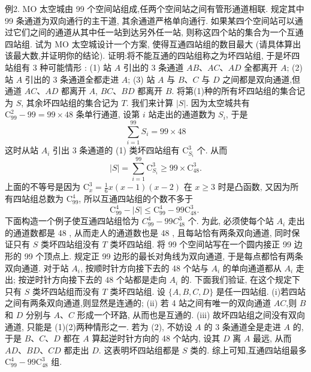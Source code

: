 例2. $\mathrm{MO}$ 太空城由 99 个空间站组成,任两个空间站之间有管形通道相联.
规定其中 99 条通道为双向通行的主干道, 其余通道严格单向通行.
如果某四个空间站可以通过它们之间的通道从其中任一站到达另外任一站, 则称这四个站的集合为一个互通四站组.
试为 $\mathrm{MO}$ 太空城设计一个方案, 使得互通四站组的数目最大 (请具体算出该最大数,并证明你的结论). 
证明:将不能互通的四站组称之为坏四站组, 于是坏四站组有 3 种可能情形 :
(1) 站 $A$ 引出的 3 条通道 $A B 、 A C 、 A D$ 全都离开 $A$;
(2) 站 $A$ 引出的 3 条通道全都走进 $A$;
(3) 站 $A$ 与 $B 、 C$ 与 $D$ 之间都是双向通道,但通道 $A C 、 A D$ 都离开 $A$, $B C 、 B D$ 都离开 $B$.
将第(1)种的所有坏四站组的集合记为 $S$, 其余坏四站组的集合记为 $T$. 我们来计算 $|S|$.
因为太空城共有 $\mathrm{C}_{99}^2-99=99 \times 48$ 条单行通道, 设第 $i$ 站走出的通道数为 $S_i$, 于是
$$
\sum_{i=1}^{99} S_i=99 \times 48
$$
这时从站 $A_i$ 引出 3 条通道的 (1) 类坏四站组有 $\mathrm{C}_{S_i}^3$ 个.
从而
$$
|S|=\sum_{i=1}^{99} \mathrm{C}_{S_i}^3 \geqslant 99 \times \mathrm{C}_{48}^3 .
$$
上面的不等号是因为 $\mathrm{C}_x^3=\frac{1}{6} x(x-1)(x-2)$ 在 $x \geqslant 3$ 时是凸函数, 又因为所有四站组总数为 $\mathrm{C}_{99}^4$, 所以互通四站组的个数不多于
$$
\mathrm{C}_{99}^4-|S| \leqslant \mathrm{C}_{99}^4-99 \mathrm{C}_{48}^3 \text {. }
$$
下面构造一个例子使互通四站组恰为 $C_{99}^4-99 C_{48}^3$ 个.
为此, 必须使每个站 $A_i$ 走出的通道数都是 48 , 从而走人的通道数也是 48 , 且每站恰有两条双向通道, 同时保证只有 $S$ 类坏四站组没有 $T$ 类坏四站组.
将 99 个空间站写在一个圆内接正 99 边形的 99 个顶点上.
规定正 99 边形的最长对角线为双向通道, 于是每点都恰有两条双向通道.
对于站 $A_i$, 按顺时针方向接下去的 48 个站与 $A_i$ 的单向通道都从 $A_i$ 走出; 按逆时针方向接下去的 48 个站都是走向 $A_i$ 的.
下面我们验证, 在这个规定下只有 $S$ 类坏四站组而没有 $T$ 类坏四站组.
设 $\{A, B, C, D\}$ 是任一四站组.
(i)若四站之间有两条双向通道,则显然是连通的;
(ii) 若 4 站之间有唯一的双向通道 $A C$,则 $B$ 和 $D$ 分别与 $A 、 C$ 形成一个环路, 从而也是互通的.
(iii) 故坏四站组之间没有双向通道, 只能是 (1)(2)两种情形之一.
若为 (2), 不妨设 $A$ 的 3 条通道全是走进 $A$ 的, 于是 $B 、 C 、 D$ 都在 $A$ 算起逆时针方向的 48 个站内, 设其 $D$ 离 $A$ 最远, 从而 $A D 、 B D 、 C D$ 都走出 $D$. 这表明坏四站组都是 $S$ 类的.
综上可知,互通四站组最多 $\mathrm{C}_{99}^4-99 \mathrm{C}_{48}^3$ 组.



